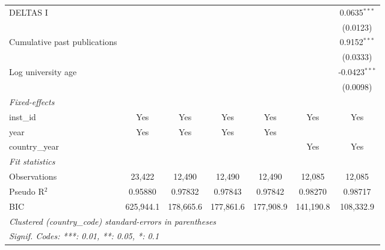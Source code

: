 \begin{tabular}{lcccccc}
   DELTAS I                                &              &                &                &                &                & 0.0635$^{***}$\\   
                                           &              &                &                &                &                & (0.0123)\\   
   Cumulative past publications            &              &                &                &                &                & 0.9152$^{***}$\\   
                                           &              &                &                &                &                & (0.0333)\\   
   Log university age                      &              &                &                &                &                & -0.0423$^{***}$\\   
                                           &              &                &                &                &                & (0.0098)\\   
   \midrule
   \emph{Fixed-effects}\\
   inst\_id                                & Yes          & Yes            & Yes            & Yes            & Yes            & Yes\\  
   year                                    & Yes          & Yes            & Yes            & Yes            &                & \\  
   country\_year                           &              &                &                &                & Yes            & Yes\\  
   \midrule
   \emph{Fit statistics}\\
   Observations                            & 23,422       & 12,490         & 12,490         & 12,490         & 12,085         & 12,085\\  
   Pseudo R$^2$                            & 0.95880      & 0.97832        & 0.97843        & 0.97842        & 0.98270        & 0.98717\\  
   BIC                                     & 625,944.1    & 178,665.6      & 177,861.6      & 177,908.9      & 141,190.8      & 108,332.9\\  
   \midrule \midrule
   \multicolumn{7}{l}{\emph{Clustered (country\_code) standard-errors in parentheses}}\\
   \multicolumn{7}{l}{\emph{Signif. Codes: ***: 0.01, **: 0.05, *: 0.1}}\\
\end{tabular}
\par\endgroup


